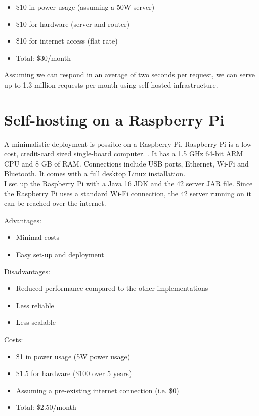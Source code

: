 \begin{itemize}
\item \$10 in power usage (assuming a 50W server)
\item \$10 for hardware (server and router)
\item \$10 for internet access (flat rate)
\item Total: \$30/month
\end{itemize}

Assuming we can respond in an average of two seconds per request, we can serve up to 1.3 million requests per month using self-hosted infrastructure.

\section{Self-hosting on a Raspberry Pi}

A minimalistic deployment is possible on a Raspberry Pi. Raspberry Pi is a low-cost, credit-card sized single-board computer. \cite{raspberry-pi-foundation-2015}. It has a 1.5 GHz 64-bit ARM CPU and 8 GB of RAM. Connections include USB ports, Ethernet, Wi-Fi and Bluetooth. It comes with a full desktop Linux installation.
\\[12pt]
I set up the Raspberry Pi with a Java 16 JDK and the 42 server JAR file. Since the Raspberry Pi uses a standard Wi-Fi connection, the 42 server running on it can be reached over the internet.


Advantages:

\begin{itemize}
\item Minimal costs
\item Easy set-up and deployment
\end{itemize}

Disadvantages:

\begin{itemize}
\item Reduced performance compared to the other implementations
\item Less reliable
\item Less scalable
\end{itemize}

Costs:

\begin{itemize}
\item \$1 in power usage (5W power usage) \cite{neukirchen-2021}
\item \$1.5 for hardware (\$100 over 5 years)
\item Assuming a pre-existing internet connection (i.e. \$0)
\item Total: \$2.50/month
\end{itemize}

